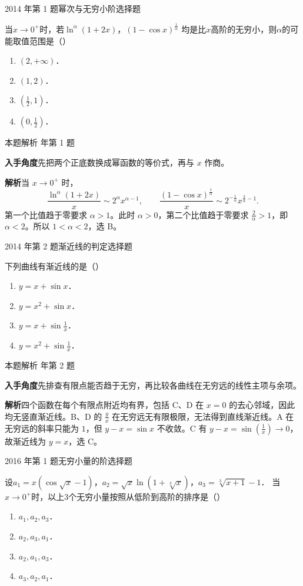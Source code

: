 \documentclass[UTF8,zihao=-4,fontset=fandol]{ctexart}
\newcommand{\pickout}{\hfill（\hspace{1.4em}）}
\newenvironment{abcd}{\begin{enumerate}[label=\textup{(\Alph*)},leftmargin=2.3em,itemsep=1pt,topsep=4pt,parsep=1pt]}{\end{enumerate}}
\newcommand{\QuestionPage}[6]{%
  \par\noindent\begin{minipage}{\linewidth}
  \raggedright
  {\small\textcolor{black!60}{#3\quad #5}\hfill\textcolor{accent}{#2}}\par\smallskip}
\newcommand{\QuestionEnd}{\end{minipage}\par\medskip}
\newcommand{\QuestionPage}[6]{%
  \clearpage
  {\small\textcolor{accent}{#1\hfill #2}}\par\medskip
  {\small\textcolor{black!60}{#3\quad #5\hfill #6}}\par\vspace{9bp}}
\newcommand{\QuestionEnd}{}
\newenvironment{QuestionSolution}[1]{%
  \clearpage
  {\small\textcolor{black!60}{本题解析\quad #1}}\par\medskip
}{\par\clearpage}
\begin{document}
\QuestionPage{1.4 无穷小量与无穷大量}{选择题}{2014 年第 1 题}{1}{幂次与无穷小阶}{021 / 234}
当$x \to 0^+$时，若$\ln^{\alpha}(1 + 2x)$，$(1 - \cos x)^{\frac{1}{\alpha}}$
均是比$x$高阶的无穷小，则$\alpha$的可能取值范围是\pickout{}
\begin{abcd}
\item $(2, +\infty)$．
\item $(1,2)$．
\item $\left(\frac{1}{2},1 \right)$．
\item $\left(0,\frac{1}{2} \right)$．
\end{abcd}
\QuestionEnd

\begin{QuestionSolution}{2014 年第 1 题}
\textbf{入手角度}\quad 先把两个正底数换成幂函数的等价式，再与 \(x\) 作商。

\textbf{解析}\quad 当 \(x\to0^+\) 时，
\[
\frac{\ln^\alpha(1+2x)}x\sim 2^\alpha x^{\alpha-1},
\qquad
\frac{(1-\cos x)^{\frac{1}{\alpha}}}x\sim 2^{-\frac{1}{\alpha}}x^{\frac{2}{\alpha}-1}.
\]
第一个比值趋于零要求 \(\alpha>1\)。此时 \(\alpha>0\)，第二个比值趋于零要求 \(\frac{2}{\alpha}>1\)，即 \(\alpha<2\)。所以 \(\boxed{1<\alpha<2}\)，选 B。
\end{QuestionSolution}

\QuestionPage{1.4 无穷小量与无穷大量}{选择题}{2014 年第 2 题}{1}{渐近线的判定}{022 / 234}
下列曲线有渐近线的是\pickout{}
\begin{abcd}
\item $y = x + \sin x$．
\item $y = x^2 + \sin x$．
\item $y = x + \sin \frac{1}{x}$．
\item $y = x^2 + \sin \frac{1}{x}$．
\end{abcd}
\QuestionEnd

\begin{QuestionSolution}{2014 年第 2 题}
\textbf{入手角度}\quad 先排查有限点能否趋于无穷，再比较各曲线在无穷远的线性主项与余项。

\textbf{解析}\quad 四个函数在每个有限点附近均有界，包括 C、D 在 \(x=0\) 的去心邻域，因此均无竖直渐近线。B、D 的 \(\frac{y}{x}\) 在无穷远无有限极限，无法得到直线渐近线。A 在无穷远的斜率只能为 \(1\)，但 \(y-x=\sin x\) 不收敛。C 有 \(y-x=\sin(\frac{1}{x})\to0\)，故渐近线为 \(y=x\)，选 C。
\end{QuestionSolution}

\QuestionPage{1.4 无穷小量与无穷大量}{选择题}{2016 年第 1 题}{1}{无穷小量的阶}{023 / 234}
设$a_1 = x(\cos \sqrt{x} - 1)$，$a_2 = \sqrt{x} \ln(1 + \sqrt[3]{x})$，$a_3 = \sqrt[3]{x + 1} - 1$．
当$x \to 0^+$时，以上$3$个无穷小量按照从低阶到高阶的排序是\pickout{}
\begin{abcd}
\item $a_1,a_2,a_3$．
\item $a_2,a_3,a_1$．
\item $a_2,a_1,a_3$．
\item $a_3,a_2,a_1$．
\end{abcd}
\QuestionEnd
\end{document}
